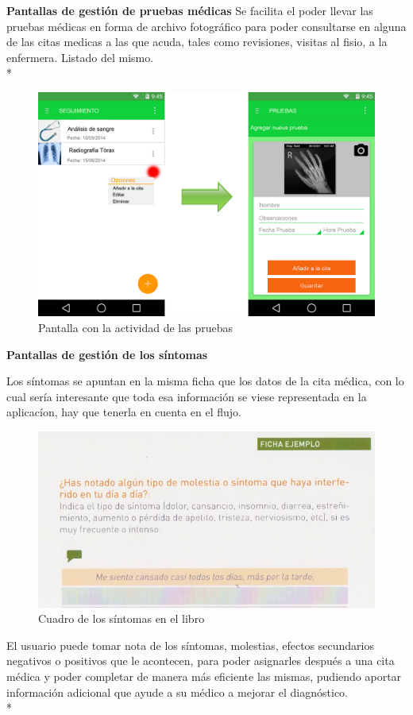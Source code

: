 \documentclass[../pfc.tex]{subfiles}
\begin{document}
		
		\textbf{Pantallas de gestión de pruebas médicas}
		Se facilita el poder llevar las pruebas médicas en forma de archivo fotográfico para poder consultarse en alguna de las citas medicas a las que acuda, tales como revisiones, visitas al fisio, a la enfermera. Listado del mismo.\\*
		
		\begin{figure}[H]
			\centering
			\includegraphics[width=0.7\linewidth]{../images/pruebas}
			\caption{Pantalla con la actividad de las pruebas}
			\label{fig:pruebas}
		\end{figure}
		
		
		\textbf{Pantallas de gestión de los síntomas}
		
		Los síntomas se apuntan en la misma ficha que los datos de la cita médica, con lo cual sería interesante que toda esa información se viese representada en la aplicacíon, hay que tenerla en cuenta en el flujo.
		
		\begin{figure}[H]
			\centering
			\includegraphics[width=0.7\linewidth]{../folleto/015_corto_a}
			\caption{Cuadro de los síntomas en el libro}
			\label{fig:sintomas_libro}
		\end{figure}
				
				

		El usuario puede tomar nota de los síntomas, molestias, efectos secundarios negativos o positivos que le acontecen, para poder asignarles después a una cita médica y poder completar de manera más eficiente las mismas, pudiendo aportar información adicional que ayude a su médico a mejorar el diagnóstico.\\*
		
\end{document}
